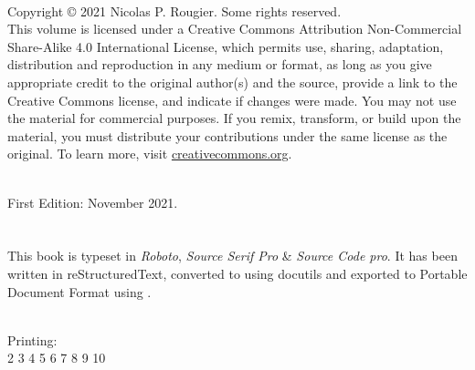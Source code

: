 ~\vfill
{\footnotesize \linespread{1.0}

 \par
 \noindent Copyright © 2021 Nicolas P. Rougier. Some rights reserved.\\

 \noindent This volume is licensed under a Creative Commons Attribution
 Non-Commercial Share-Alike 4.0 International License, which permits use,
 sharing, adaptation, distribution and reproduction in any medium or format,
 as long as you give appropriate credit to the original author(s) and the
 source, provide a link to the Creative Commons license, and indicate if
 changes were made. You may not use the material for commercial purposes. If
 you remix, transform, or build upon the material, you must distribute your
 contributions under the same license as the original. To learn more, visit
 \href{https://creativecommons.org}{creativecommons.org}.\par
 ~\\
 \noindent First Edition: November 2021.\\
 \ISBN\\
  ~\\
 \noindent This book is typeset in
 {\em Roboto}, {\em Source Serif Pro} \& {\em Source Code pro}. It has been written in reStructuredText, converted to  using docutils and exported to Portable Document Format using .\par
~\\
\noindent Printing: 
~\\
 2 3 4 5 6 7 8 9 10\\
}
\cleardoublepage
